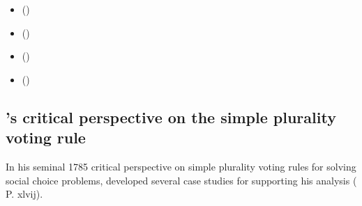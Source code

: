 \documentclass[a4paper,12pt,english]{sphinxhowto}
\begin{document}
\begin{sphinxcontents}
\begin{itemize}
\item {} 
\sphinxAtStartPar
{}\label{\detokenize{pearls:id149}}{\hyperref[\detokenize{pearls:condorcet-s-critical-perspective-on-the-simple-plurality-voting-rule}]{}} ()

\item {} 
\sphinxAtStartPar
{}\label{\detokenize{pearls:id150}}{\hyperref[\detokenize{pearls:two-stage-elections-with-multipartisan-primary-selection}]{}} ()

\item {} 
\sphinxAtStartPar
{}\label{\detokenize{pearls:id151}}{\hyperref[\detokenize{pearls:tempering-plurality-tyranny-effects-with-bipolar-approval-voting}]{}} ()

\item {} 
\sphinxAtStartPar
{}\label{\detokenize{pearls:id152}}{\hyperref[\detokenize{pearls:selecting-the-winner-of-a-primary-election-a-critical-commentary}]{}} ()

\end{itemize}
\end{sphinxcontents}


\subsection{’s critical perspective on the simple plurality voting rule}
\label{\detokenize{pearls:condorcet-s-critical-perspective-on-the-simple-plurality-voting-rule}}\label{\detokenize{pearls:condorcet-tutorial-label}}
\sphinxAtStartPar
In his seminal 1785 critical perspective on simple plurality voting rules for solving social choice problems,  developed several case studies for supporting his analysis ( P. xlvij).
\end{document}
